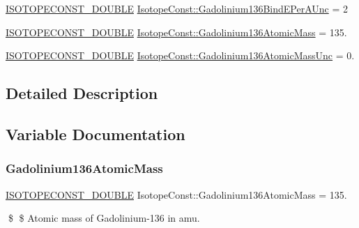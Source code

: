 \begin{DoxyCompactItemize}
\mbox{\hyperlink{group___isotope_const-_macros_ga8f45a7272ce02c0b4c65c44636ed719a}{I\+S\+O\+T\+O\+P\+E\+C\+O\+N\+S\+T\+\_\+\+D\+O\+U\+B\+LE}} \mbox{\hyperlink{group___isotope_const-_gadolinium-_gd136_gab60c3983c6421e889fff6f7dcd7f159a}{Isotope\+Const\+::\+Gadolinium136\+Bind\+E\+Per\+A\+Unc}} = 2
\item 
\mbox{\hyperlink{group___isotope_const-_macros_ga8f45a7272ce02c0b4c65c44636ed719a}{I\+S\+O\+T\+O\+P\+E\+C\+O\+N\+S\+T\+\_\+\+D\+O\+U\+B\+LE}} \mbox{\hyperlink{group___isotope_const-_gadolinium-_gd136_ga850d3f18e640e5506d236c79c2f92199}{Isotope\+Const\+::\+Gadolinium136\+Atomic\+Mass}} = 135.
\item 
\mbox{\hyperlink{group___isotope_const-_macros_ga8f45a7272ce02c0b4c65c44636ed719a}{I\+S\+O\+T\+O\+P\+E\+C\+O\+N\+S\+T\+\_\+\+D\+O\+U\+B\+LE}} \mbox{\hyperlink{group___isotope_const-_gadolinium-_gd136_ga98034e016183bec284d559a8bc5bfa9a}{Isotope\+Const\+::\+Gadolinium136\+Atomic\+Mass\+Unc}} = 0.
\end{DoxyCompactItemize}


\subsection{Detailed Description}


\subsection{Variable Documentation}
\mbox{\label{group___isotope_const-_gadolinium-_gd136_ga850d3f18e640e5506d236c79c2f92199}} 
\subsubsection{\texorpdfstring{Gadolinium136\+Atomic\+Mass}{Gadolinium136AtomicMass}}
{\footnotesize\ttfamily \mbox{\hyperlink{group___isotope_const-_macros_ga8f45a7272ce02c0b4c65c44636ed719a}{I\+S\+O\+T\+O\+P\+E\+C\+O\+N\+S\+T\+\_\+\+D\+O\+U\+B\+LE}} Isotope\+Const\+::\+Gadolinium136\+Atomic\+Mass = 135.}

\$ \$ Atomic mass of Gadolinium-\/136 in amu. \mbox{\label{group___isotope_const-_gadolinium-_gd136_ga98034e016183bec284d559a8bc5bfa9a}} 
